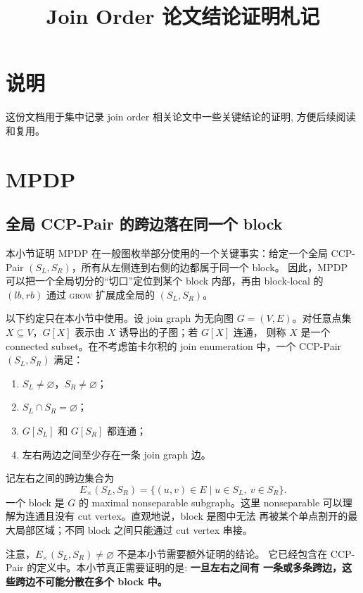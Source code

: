\documentclass[UTF8]{ctexart}
\title{Join Order 论文结论证明札记}
\author{}
\date{}
\begin{document}
\maketitle
\pagestyle{plain}

\section*{说明}

这份文档用于集中记录 join order 相关论文中一些关键结论的证明, 方便后续阅读和复用。

\tableofcontents

\section{MPDP}

\subsection{全局 CCP-Pair 的跨边落在同一个 block}

本小节证明 MPDP 在一般图枚举部分使用的一个关键事实：给定一个全局
CCP-Pair \((S_L,S_R)\)，所有从左侧连到右侧的边都属于同一个 block。
因此，MPDP 可以把一个全局切分的``切口''定位到某个 block 内部，再由
block-local 的 \((lb, rb)\) 通过 \textsc{grow} 扩展成全局的
\((S_L,S_R)\)。

以下约定只在本小节中使用。设 join graph 为无向图 \(G=(V,E)\)。对任意点集
\(X\subseteq V\)，\(G[X]\) 表示由 \(X\) 诱导出的子图；若 \(G[X]\) 连通，
则称 \(X\) 是一个 connected subset。在不考虑笛卡尔积的 join enumeration
中，一个 CCP-Pair \((S_L,S_R)\) 满足：
\begin{enumerate}[label=(\arabic*)]
  \item \(S_L\neq\varnothing\)，\(S_R\neq\varnothing\)；
  \item \(S_L\cap S_R=\varnothing\)；
  \item \(G[S_L]\) 和 \(G[S_R]\) 都连通；
  \item 左右两边之间至少存在一条 join graph 边。
\end{enumerate}
记左右之间的跨边集合为
\[
E_\times(S_L,S_R)=\{(u,v)\in E\mid u\in S_L,\ v\in S_R\}.
\]
一个 block 是 \(G\) 的 maximal nonseparable subgraph。这里
nonseparable 可以理解为连通且没有 cut vertex。直观地说，block 是图中无法
再被某个单点割开的最大局部区域；不同 block 之间只能通过 cut vertex 串接。

注意，\(E_\times(S_L,S_R)\neq\varnothing\) 不是本小节需要额外证明的结论。
它已经包含在 CCP-Pair 的定义中。本小节真正需要证明的是: \textbf{一旦左右之间有
一条或多条跨边，这些跨边不可能分散在多个 block 中。}
\end{document}
